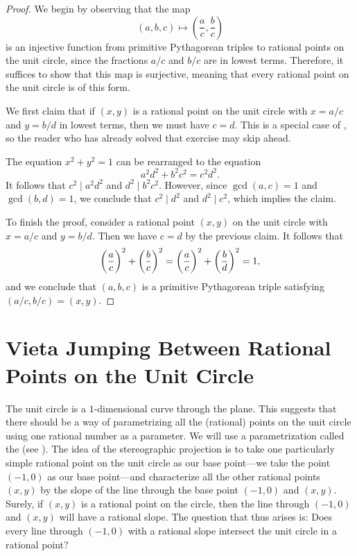 \begin{proof}
  We begin by observing that the map
  \begin{equation*}
    (a,b,c)\mapsto \left(\frac{a}{c},\frac{b}{c}\right)
  \end{equation*}
  is an injective function from primitive Pythagorean triples to rational points on the unit circle, since the fractions $a/c$ and $b/c$ are in lowest terms. Therefore, it suffices to show that this map is surjective, meaning that every rational point on the unit circle is of this form.

  We first claim that if $(x,y)$ is a rational point on the unit circle with $x=a/c$ and $y= b/d$ in lowest terms, then we must have $c=d$. This is a special case of , so the reader who has already solved that exercise may skip ahead.

  The equation $x^2+y^2=1$ can be rearranged to the equation
  \begin{equation*}
    a^2d^2+b^2c^2=c^2d^2.
  \end{equation*}
  It follows that $c^2\mid a^2d^2$ and $d^2\mid b^2c^2$. However, since $\gcd(a,c)=1$ and $\gcd(b,d)=1$, we conclude that $c^2\mid d^2$ and $d^2\mid c^2$, which implies the claim.

  To finish the proof, consider a rational point $(x,y)$ on the unit circle with $x=a/c$ and $y=b/d$. Then we have $c=d$ by the previous claim. It follows that
  \begin{equation*}
    \left(\frac{a\vphantom{b}}{c\vphantom{d}}\right)^2+\left(\frac{b}{c\vphantom{d}}\right)^2=\left(\frac{a\vphantom{b}}{c\vphantom{d}}\right)^2+\left(\frac{b}{d\vphantom{c}}\right)^2=1,
  \end{equation*}
  and we conclude that $(a,b,c)$ is a primitive Pythagorean triple satisfying $(a/c,b/c)=(x,y)$.
\end{proof}

\section[Vieta Jumping]{Vieta Jumping Between Rational Points on the Unit Circle}\label{section:vieta-jumping}

The unit circle is a $1$-dimensional curve through the plane. This suggests that there should be a way of parametrizing all the (rational) points on the unit circle using one rational number as a parameter. We will use a parametrization called the  (see ). The idea of the stereographic projection is to take one particularly simple rational point on the unit circle as our base point---we take the point $(-1,0)$ as our base point---and characterize all the other rational points $(x,y)$ by the slope of the line through the base point $(-1,0)$ and $(x,y)$. Surely, if $(x,y)$ is a rational point on the circle, then the line through $(-1,0)$ and $(x,y)$ will have a rational slope. The question that thus arises is: Does every line through $(-1,0)$ with a rational slope intersect the unit circle in a rational point?

